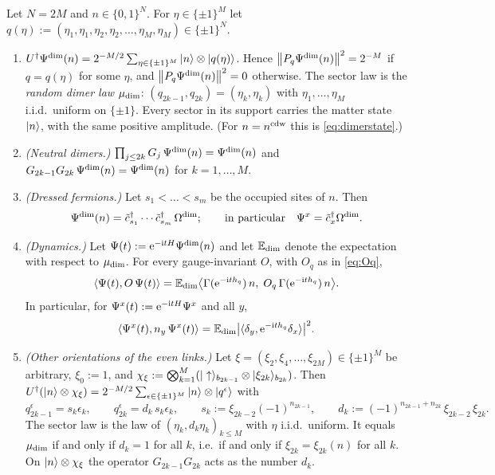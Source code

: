 \begin{proposition}\label{prop:dimerlaw}
Let $N=2M$ and $n\in\{0,1\}^N$.  For $\eta\in\{\pm1\}^M$ let
$q(\eta):=(\eta_1,\eta_1,\eta_2,\eta_2,\dots,\eta_M,\eta_M)\in\{\pm1\}^N$.
\begin{enumerate}[label=(\alph*)]
\item $U^\dagger\Psi^{\mathrm{dim}}(n)=2^{-M/2}\sum_{\eta\in\{\pm1\}^M}|n\rangle\otimes|q(\eta)\rangle$.  Hence
$\left\|P_q\Psi^{\mathrm{dim}}(n)\right\|^2=2^{-M}$ if $q=q(\eta)$ for some $\eta$, and $\left\|P_q\Psi^{\mathrm{dim}}(n)\right\|^2=0$
otherwise.  The sector law is the \emph{random dimer law} $\mu_{\mathrm{dim}}$: $(q_{2k-1},q_{2k})=(\eta_k,\eta_k)$
with $\eta_1,\dots,\eta_M$ i.i.d.\ uniform on $\{\pm1\}$.  Every sector in its support carries the
matter state $|n\rangle$, with the same positive amplitude.  (For $n=n^{\mathrm{cdw}}$ this is \eqref{eq:dimerstate}.)
\item \emph{(Neutral dimers.)}  $\prod_{j\le2k}G_j\,\Psi^{\mathrm{dim}}(n)=\Psi^{\mathrm{dim}}(n)$ and
$G_{2k-1}G_{2k}\,\Psi^{\mathrm{dim}}(n)=\Psi^{\mathrm{dim}}(n)$ for $k=1,\dots,M$.
\item \emph{(Dressed fermions.)}  Let $s_1<\dots<s_m$ be the occupied sites of $n$.  Then
\[
  \Psi^{\mathrm{dim}}(n)=\tilde c_{s_1}^\dagger\cdots\tilde c_{s_m}^\dagger\,\Omega^{\mathrm{dim}};\qquad\text{in particular}\quad\Psi^x=\tilde c_x^\dagger\Omega^{\mathrm{dim}} .
\]
\item \emph{(Dynamics.)}  Let $\Psi(t):=\mathrm{e}^{-\mathrm{i} tH}\Psi^{\mathrm{dim}}(n)$ and let $\mathbb{E}_{\mathrm{dim}}$ denote the expectation
with respect to $\mu_{\mathrm{dim}}$.  For every gauge-invariant $O$, with $O_q$ as in \eqref{eq:Oq},
\begin{equation}\label{eq:dimeravg}
  \langle\Psi(t),O\,\Psi(t)\rangle=\mathbb{E}_{\mathrm{dim}}\bigl\langle\Gamma(\mathrm{e}^{-\mathrm{i} th_{q}})\,n,\;O_q\,\Gamma(\mathrm{e}^{-\mathrm{i} th_{q}})\,n\bigr\rangle .
\end{equation}
In particular, for $\Psi^x(t):=\mathrm{e}^{-\mathrm{i} tH}\Psi^x$ and all $y$,
\begin{equation}\label{eq:dimerdensity}
  \langle\Psi^x(t),n_y\,\Psi^x(t)\rangle=\mathbb{E}_{\mathrm{dim}}\bigl|\langle\delta_y,\mathrm{e}^{-\mathrm{i} th_{q}}\delta_x\rangle\bigr|^2 .
\end{equation}
\item \emph{(Other orientations of the even links.)}  Let $\xi=(\xi_2,\xi_4,\dots,\xi_{2M})\in\{\pm1\}^M$
be arbitrary, $\xi_0:=1$, and
$\chi_\xi:=\bigotimes_{k=1}^M(|\uparrow\rangle_{b_{2k-1}}\otimes|\xi_{2k}\rangle_{b_{2k}})$.  Then
$U^\dagger(|n\rangle\otimes\chi_\xi)=2^{-M/2}\sum_{\epsilon\in\{\pm1\}^M}|n\rangle\otimes|q^\epsilon\rangle$ with
\begin{equation}\label{eq:dimersigns}
  q^\epsilon_{2k-1}=s_k\epsilon_k,\qquad q^\epsilon_{2k}=d_k\,s_k\epsilon_k,\qquad
  s_k:=\xi_{2k-2}(-1)^{n_{2k-1}},\qquad d_k:=(-1)^{n_{2k-1}+n_{2k}}\,\xi_{2k-2}\,\xi_{2k} .
\end{equation}
The sector law is the law of $(\eta_k,d_k\eta_k)_{k\le M}$ with $\eta$ i.i.d.\ uniform.  It equals
$\mu_{\mathrm{dim}}$ if and only if $d_k=1$ for all $k$, i.e.\ if and only if $\xi_{2k}=\xi_{2k}(n)$ for all $k$.
On $|n\rangle\otimes\chi_\xi$ the operator $G_{2k-1}G_{2k}$ acts as the number $d_k$.
\end{enumerate}
\end{proposition}

